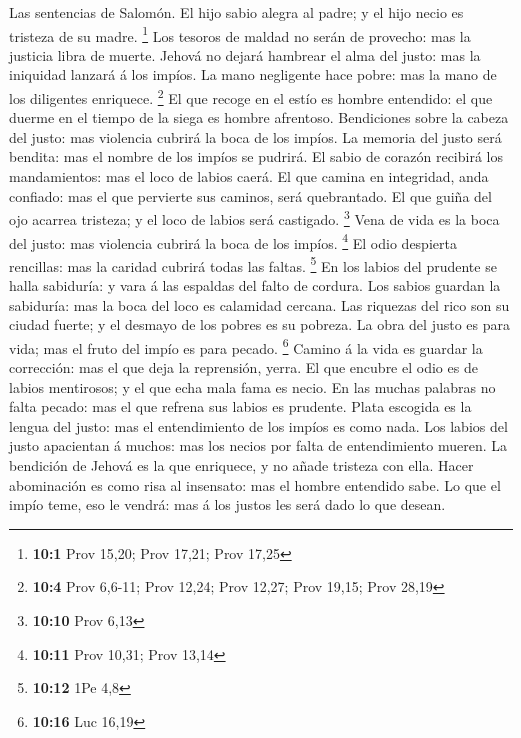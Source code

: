  Las sentencias de Salomón. El hijo sabio alegra al padre;
y el hijo necio es tristeza de su madre. \footnote{\textbf{10:1} Prov
  15,20; Prov 17,21; Prov 17,25}  Los tesoros de maldad no
serán de provecho: mas la justicia libra de muerte. 
Jehová no dejará hambrear el alma del justo: mas la iniquidad lanzará á
los impíos.  La mano negligente hace pobre: mas la mano de
los diligentes enriquece. \footnote{\textbf{10:4} Prov 6,6-11; Prov
  12,24; Prov 12,27; Prov 19,15; Prov 28,19}  El que
recoge en el estío es hombre entendido: el que duerme en el tiempo de la
siega es hombre afrentoso.  Bendiciones sobre la cabeza
del justo: mas violencia cubrirá la boca de los impíos. 
La memoria del justo será bendita: mas el nombre de los impíos se
pudrirá.  El sabio de corazón recibirá los mandamientos:
mas el loco de labios caerá.  El que camina en integridad,
anda confiado: mas el que pervierte sus caminos, será quebrantado.
 El que guiña del ojo acarrea tristeza; y el loco de
labios será castigado. \footnote{\textbf{10:10} Prov 6,13}
 Vena de vida es la boca del justo: mas violencia cubrirá
la boca de los impíos. \footnote{\textbf{10:11} Prov 10,31; Prov 13,14}
 El odio despierta rencillas: mas la caridad cubrirá
todas las faltas. \footnote{\textbf{10:12} 1Pe 4,8}  En
los labios del prudente se halla sabiduría: y vara á las espaldas del
falto de cordura.  Los sabios guardan la sabiduría: mas
la boca del loco es calamidad cercana.  Las riquezas del
rico son su ciudad fuerte; y el desmayo de los pobres es su pobreza.
 La obra del justo es para vida; mas el fruto del impío
es para pecado. \footnote{\textbf{10:16} Luc 16,19} 
Camino á la vida es guardar la corrección: mas el que deja la
reprensión, yerra.  El que encubre el odio es de labios
mentirosos; y el que echa mala fama es necio.  En las
muchas palabras no falta pecado: mas el que refrena sus labios es
prudente.  Plata escogida es la lengua del justo: mas el
entendimiento de los impíos es como nada.  Los labios del
justo apacientan á muchos: mas los necios por falta de entendimiento
mueren.  La bendición de Jehová es la que enriquece, y no
añade tristeza con ella.  Hacer abominación es como risa
al insensato: mas el hombre entendido sabe.  Lo que el
impío teme, eso le vendrá: mas á los justos les será dado lo que desean.
